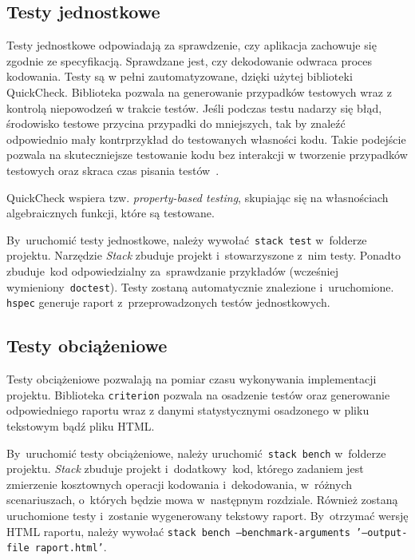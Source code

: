 \documentclass[../../praca.tex]{subfiles}
\begin{document}
\subsection{Testy jednostkowe}

Testy jednostkowe odpowiadają za sprawdzenie, czy aplikacja zachowuje
się zgodnie ze specyfikacją. Sprawdzane jest, czy dekodowanie odwraca
proces kodowania. Testy są w pełni zautomatyzowane, dzięki
użytej biblioteki QuickCheck. Biblioteka pozwala na generowanie przypadków
testowych wraz z kontrolą niepowodzeń w trakcie testów. Jeśli podczas testu
nadarzy się błąd, środowisko testowe przycina przypadki do mniejszych, tak by
znaleźć odpowiednio mały kontrprzykład do testowanych własności kodu. 
Takie podejście pozwala na skuteczniejsze testowanie kodu bez interakcji w tworzenie
przypadków testowych oraz skraca czas pisania testów~\cite{Claessen:QLT}.

QuickCheck wspiera tzw. \emph{property-based testing}, skupiając się 
na własnościach algebraicznych funkcji, które są testowane.

By~uruchomić testy jednostkowe, należy wywołać~\texttt{stack test}
w~folderze projektu. Narzędzie \emph{Stack} zbuduje projekt
i~stowarzyszone z~nim testy. Ponadto zbuduje~kod
odpowiedzialny za~sprawdzanie przykładów (wcześniej
wymieniony~\texttt{doctest}). Testy zostaną automatycznie
znalezione i~uruchomione. \texttt{hspec} 
generuje raport z~przeprowadzonych testów jednostkowych.

\subsection{Testy obciążeniowe}

Testy obciążeniowe pozwalają na pomiar czasu wykonywania implementacji projektu.
Biblioteka \texttt{criterion} pozwala na osadzenie testów oraz generowanie
odpowiedniego raportu wraz z danymi statystycznymi osadzonego w pliku tekstowym
bądź pliku HTML.

By~uruchomić testy obciążeniowe, należy uruchomić~\texttt{stack bench}
w~folderze projektu. \emph{Stack} zbuduje projekt
i~dodatkowy~kod, którego zadaniem jest zmierzenie
kosztownych operacji kodowania i~dekodowania,
w~różnych scenariuszach, o~których będzie mowa
w~następnym rozdziale. Również zostaną uruchomione
testy i~zostanie wygenerowany tekstowy raport. 
By~otrzymać wersję HTML raportu, należy wywołać
\texttt{stack bench --benchmark-arguments '--output-file raport.html'}.
\end{document}
